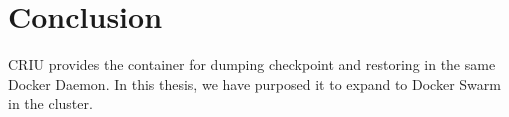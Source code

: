 \chapter{Conclusion}
\label{chap:conclusion}
CRIU provides the container for dumping checkpoint and restoring in the same Docker Daemon. In this thesis, we have purposed it to expand to Docker Swarm in the cluster.